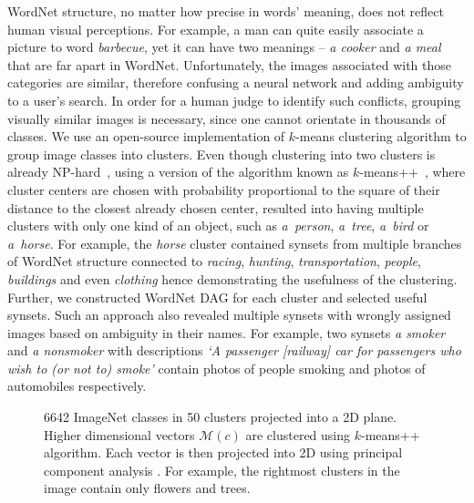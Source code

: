 WordNet structure, no matter how precise in words' meaning, does not reflect human visual perceptions. For example, a man can quite easily associate a picture to word \textit{barbecue}, yet it can have two meanings -- \textit{a cooker} and \textit{a meal} that are far apart in WordNet. Unfortunately, the images associated with those categories are similar, therefore confusing a neural network and adding ambiguity to a user's search. In order for a human judge to identify such conflicts, grouping visually similar images is necessary, since one cannot orientate in thousands of classes. We use an open-source implementation \cite{scikit-learn} of $k$-means clustering algorithm to group image classes into clusters. Even though clustering into two clusters is already NP-hard~\cite{dasgupta2008hardnessKmeans}, using a version of the algorithm known as $k$-means++~\cite{kmeans}, where cluster centers are chosen with probability proportional to the square of their distance to the closest already chosen center, resulted into having multiple clusters with only one kind of an object, such as \textit{a~person}, \textit{a~tree}, \textit{a~bird} or \textit{a~horse}. For example, the \textit{horse} cluster contained synsets from multiple branches of WordNet structure connected to \textit{racing}, \textit{hunting}, \textit{transportation}, \textit{people}, \textit{buildings} and even \textit{clothing} hence demonstrating the usefulness of the clustering. Further, we constructed WordNet DAG for each cluster and selected useful synsets. Such an approach also revealed multiple synsets with wrongly assigned images based on ambiguity in their names. For example, two synsets \textit{a smoker} and \textit{a nonsmoker} with descriptions \textit{`A passenger [railway] car for passengers who wish to (or not to) smoke'} contain photos of people smoking and photos of automobiles respectively.


\begin{figure}
	\centering
	\scalebox{0.8}{}
	\caption[Projection of ImageNet classes into 2D]{6642 ImageNet classes in 50 clusters projected into a 2D plane. Higher dimensional vectors $\mathcal{M}(c)$ are clustered using $k$-means++ \cite{kmeans} algorithm. Each vector is then projected into 2D using principal component analysis \cite{pca}. For example, the rightmost clusters in the image contain only flowers and trees.}
	\label{fig:dataset_clusters}
\end{figure}

